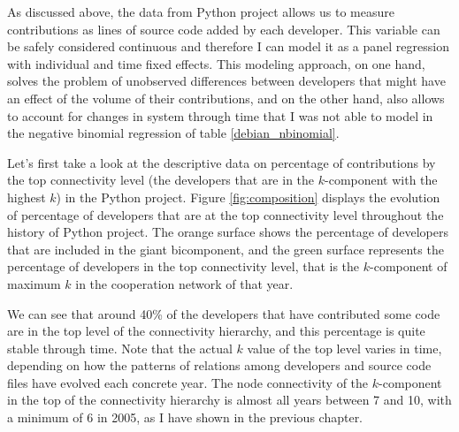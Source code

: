 As discussed above, the data from Python project allows us to measure contributions as lines of source code added by each developer. This variable can be safely considered continuous and therefore I can model it as a panel regression with individual and time fixed effects. This modeling approach, on one hand, solves the problem of unobserved differences between developers that might have an effect of the volume of their contributions, and on the other hand, also allows to account for changes in system through time that I was not able to model in the negative binomial regression of table \ref{debian_nbinomial}.
 
Let's first take a look at the descriptive data on percentage of contributions by the top connectivity level (the developers that are in the $k$-component with the highest $k$) in the Python project. Figure \ref{fig:composition} displays the evolution of percentage of developers that are at the top connectivity level throughout the history of Python project. The orange surface shows the percentage of developers that are included in the giant bicomponent, and the green surface represents the percentage of developers in the top connectivity level, that is the $k$-component of maximum $k$ in the cooperation network of that year.

We can see that around 40\% of the developers that have contributed some code are in the top level of the connectivity hierarchy, and this percentage is quite stable through time. Note that the actual $k$ value of the top level varies in time, depending on how the patterns of relations among developers and source code files have evolved each concrete year. The node connectivity of the $k$-component in the top of the connectivity hierarchy is almost all years between 7 and 10, with a minimum of 6 in 2005, as I have shown in the previous chapter.

